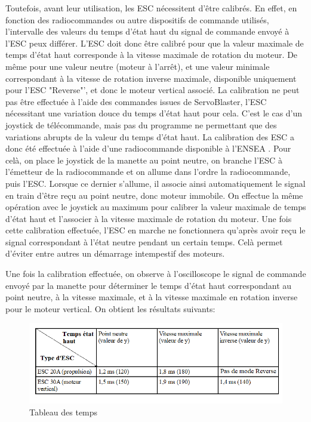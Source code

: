 \documentclass[a4paper,11pt]{report}
\begin{document}
			Toutefois, avant leur utilisation, les ESC nécessitent d'être calibrés. En effet, en fonction des radiocommandes ou autre dispositifs de commande utilisés, l'intervalle des valeurs du temps d'état haut du signal de commande envoyé à l'ESC peux différer. L'ESC doit donc être calibré pour que la valeur maximale de temps d'état haut corresponde à la vitesse maximale de rotation du moteur. De même pour une valeur neutre (moteur à l'arrêt), et une valeur minimale correspondant à la vitesse de rotation inverse maximale, disponible uniquement pour l'ESC "Reverse"', et donc le moteur vertical associé. \newline
			La calibration ne peut pas être effectuée à l'aide des commandes issues de ServoBlaster, l'ESC nécessitant une variation douce du temps d'état haut pour cela. C'est le cas d'un joystick de télécommande, mais pas du programme ne permettant que des variations abrupts de la valeur du temps d'état haut. La calibration des ESC a donc été effectuée à l'aide d'une radiocommande disponible à l'ENSEA \cite{ref9}. Pour celà, on place le joystick de la manette au point neutre, on branche l'ESC à l'émetteur de la radiocommande et on allume dans l'ordre la radiocommande, puis l'ESC. Lorsque ce dernier s'allume, il associe ainsi automatiquement le signal en train d'être reçu au point neutre, donc moteur immobile. On effectue la même opération avec le joystick au maximum pour calibrer la valeur maximale de temps d'état haut et l'associer à la vitesse maximale de rotation du moteur. Une fois cette calibration effectuée, l'ESC en marche ne fonctionnera qu'après avoir reçu le signal correspondant à l'état neutre pendant un certain temps. Celà permet d'éviter entre autres un démarrage intempestif des moteurs. \newline
			
			Une fois la calibration effectuée, on observe à l'oscilloscope le signal de commande envoyé par la manette pour déterminer le temps d'état haut correspondant au point neutre, à la vitesse maximale, et à la vitesse maximale en rotation inverse pour le moteur vertical.
\newline On obtient les résultats suivants:
			
			\begin{figure}[!h]
				  \begin{center}
				  	\includegraphics[scale=0.8]{Photos/tempsesc}
						\caption{Tableau des temps}
				  \end{center}
		  	\end{figure}
				
\end{document}
